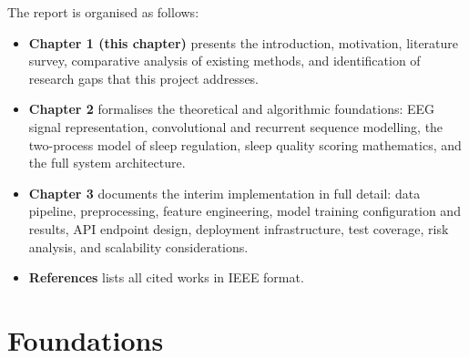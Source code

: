 \documentclass[10pt]{article}
\begin{document}
The report is organised as follows:
\begin{itemize}
  \item \textbf{Chapter 1 (this chapter)} presents the introduction, motivation, literature survey, comparative analysis of existing methods, and identification of research gaps that this project addresses.
  \item \textbf{Chapter 2} formalises the theoretical and algorithmic foundations: EEG signal representation, convolutional and recurrent sequence modelling, the two-process model of sleep regulation, sleep quality scoring mathematics, and the full system architecture.
  \item \textbf{Chapter 3} documents the interim implementation in full detail: data pipeline, preprocessing, feature engineering, model training configuration and results, API endpoint design, deployment infrastructure, test coverage, risk analysis, and scalability considerations.
  \item \textbf{References} lists all cited works in IEEE format.
\end{itemize}

\newpage
\section{Foundations}
\label{sec:foundations}
\end{document}
